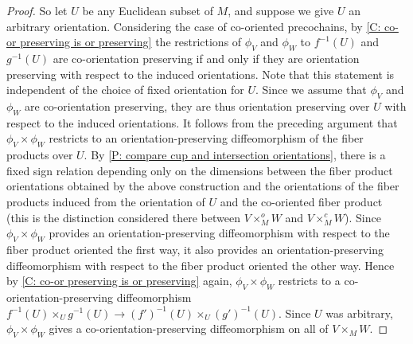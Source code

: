 \begin{proof}
	So let $U$ be any Euclidean subset of $M$, and suppose we give $U$ an arbitrary orientation.
	Considering the case of co-oriented precochains, by \cref{C: co-or preserving is or preserving} the restrictions of $\phi_V$ and $\phi_W$ to $f^{-1}(U)$ and $g^{-1}(U)$ are co-orientation preserving if and only if they are orientation preserving with respect to the induced orientations.
	Note that this statement is independent of the choice of fixed orientation for $U$.
	Since we assume that $\phi_V$ and $\phi_W$ are co-orientation preserving, they are thus orientation preserving over $U$ with respect to the induced orientations.
	It follows from the preceding argument that $\phi_V \times \phi_W$ restricts to an orientation-preserving diffeomorphism of the fiber products over $U$.
	By \cref{P: compare cup and intersection orientations}, there is a fixed sign relation depending only on the dimensions between the fiber product orientations obtained by the above construction and the orientations of the fiber products induced from the orientation of $U$ and the co-oriented fiber product (this is the distinction considered there between $V \times^o_M W$ and $V \times^c_M W$).
	Since $\phi_V \times \phi_W$ provides an orientation-preserving diffeomorphism with respect to the fiber product oriented the first way, it also provides an orientation-preserving diffeomorphism with respect to the fiber product oriented the other way.
	Hence by \cref{C: co-or preserving is or preserving} again, $\phi_V \times \phi_W$ restricts to a co-orientation-preserving diffeomorphism $f^{-1}(U) \times_U g^{-1}(U) \to (f')^{-1}(U) \times_U (g')^{-1}(U)$.
	Since $U$ was arbitrary,  $\phi_V \times \phi_W$ gives a co-orientation-preserving diffeomorphism on all of $V \times_M W$.


\end{proof}
